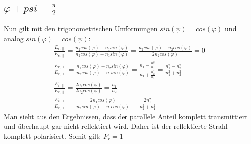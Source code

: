 \subsection*{$\varphi+psi=\frac{\pi}{2}$}
Nun gilt mit den trigonometrischen Umformungen $sin(\psi)=cos(\varphi)$ und analog $sin(\varphi)=cos(\psi)$:
\begin{align*}
\frac{E_{r,\parallel}}{E_{e,\parallel}}=\frac{n_2cos(\varphi)-n_1sin(\varphi)}{n_2cos(\varphi)+n_1sin(\varphi)}= \frac{n_2cos(\varphi)-n_2cos(\varphi)}{2n_2cos(\varphi)}=0\\
\frac{E_{r,\perp}}{E_{e,\perp}}=\frac{n_1cos(\varphi)-n_2sin(\varphi)}{n_2cos(\varphi)+n_1sin(\varphi)}=\frac{n_1-\frac{n_2^2}{n_1}}{n_1+\frac{n_2^2}{n_1}}=\frac{n_1^2-n_2^2}{n_1^2+n_2^2}\\
\frac{E_{t,\parallel}}{E_{e,\parallel}}=\frac{2n_1cos(\varphi)}{2n_2cos(\varphi)}=\frac{n_1}{n_2}\\
\frac{E_{t,\perp}}{E_{e,\perp}}=\frac{2n_1cos(\varphi)}{n_2sin(\varphi)+n_1cos(\varphi)}=\frac{2n^2_1}{n_2^2+n_1^2}
\end{align*}
Man sieht aus den Ergebnissen, dass der parallele Anteil komplett transmittiert und überhaupt gar nicht reflektiert wird. Daher ist der reflektierte Strahl komplett polarisiert. Somit gilt: $P_r=1$




